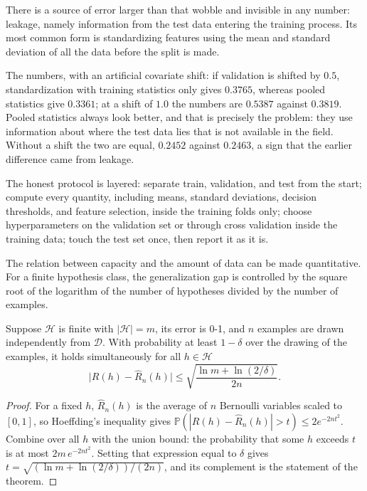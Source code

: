 There is a source of error larger than that wobble and invisible in any number:
leakage, namely information from the test data entering the training process. Its
most common form is standardizing features using the mean and standard deviation of
all the data before the split is made.

The numbers, with an artificial covariate shift: if validation is shifted by $0.5$,
standardization with training statistics only gives $0.3765$, whereas pooled
statistics give $0.3361$; at a shift of $1.0$ the numbers are $0.5387$ against
$0.3819$. Pooled statistics always look better, and that is precisely the problem: they
use information about where the test data lies that is not available in the field.
Without a shift the two are equal, $0.2452$ against $0.2463$, a sign that the earlier
difference came from leakage.

The honest protocol is layered: separate train, validation, and test from the start;
compute every quantity, including means, standard deviations, decision thresholds,
and feature selection, inside the training folds only; choose hyperparameters on the
validation set or through cross validation inside the training data; touch the test
set once, then report it as it is.

The relation between capacity and the amount of data can be made quantitative. For a
finite hypothesis class, the generalization gap is controlled by the square root of
the logarithm of the number of hypotheses divided by the number of examples.

\begin{teorema}
Suppose $\mathcal{H}$ is finite with $|\mathcal{H}|=m$, its error is 0-1, and $n$
examples are drawn independently from $\mathcal{D}$. With probability at least
$1-\delta$ over the drawing of the examples, it holds simultaneously for all
$h\in\mathcal{H}$
\[
\bigl|R(h)-\hat R_n(h)\bigr|\le\sqrt{\frac{\ln m+\ln(2/\delta)}{2n}} .
\]
\end{teorema}

\begin{proof}[Proof]
For a fixed $h$, $\hat R_n(h)$ is the average of $n$ Bernoulli variables scaled to
$[0,1]$, so Hoeffding's inequality gives
$\mathbb{P}(|R(h)-\hat R_n(h)|>t)\le2e^{-2nt^2}$. Combine over all $h$ with the union
bound: the probability that some $h$ exceeds $t$ is at most
$2m\,e^{-2nt^2}$. Setting that expression equal to $\delta$ gives
$t=\sqrt{(\ln m+\ln(2/\delta))/(2n)}$, and its complement is the statement of the
theorem.
\end{proof}

